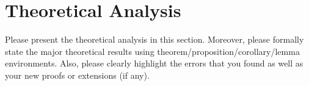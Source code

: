 \section{Theoretical Analysis}
\label{section:analysis}
Please present the theoretical analysis in this section. Moreover, please formally state the major theoretical results using theorem/proposition/corollary/lemma environments. Also, please clearly highlight the errors that you found as well as your new proofs or extensions (if any).


